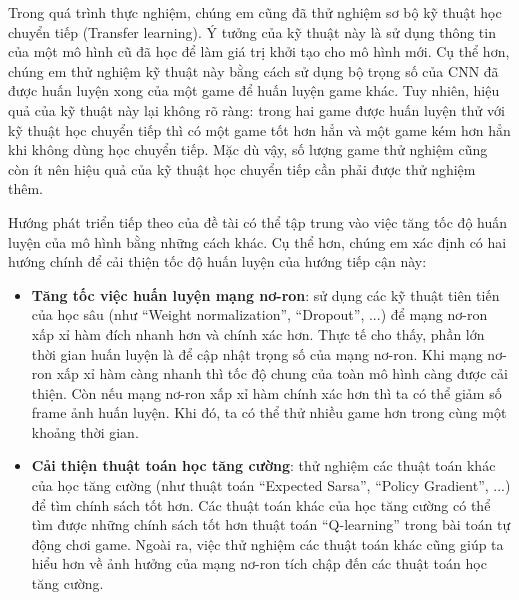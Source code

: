 	Trong quá trình thực nghiệm, chúng em cũng đã thử nghiệm sơ bộ kỹ thuật học chuyển tiếp (Transfer learning).
	Ý tưởng của kỹ thuật này là sử dụng thông tin của một mô hình cũ đã học để làm giá trị khởi tạo cho mô hình mới.
	Cụ thể hơn, chúng em thử nghiệm kỹ thuật này bằng cách sử dụng bộ trọng số của CNN đã được huấn luyện xong của một game để huấn luyện game khác.
	Tuy nhiên, hiệu quả của kỹ thuật này lại không rõ ràng: trong hai game được huấn luyện thử với kỹ thuật học chuyển tiếp thì có một game tốt hơn hẳn và một game kém hơn hẳn khi không dùng học chuyển tiếp.
	Mặc dù vậy, số lượng game thử nghiệm cũng còn ít nên hiệu quả của kỹ thuật học chuyển tiếp cần phải được thử nghiệm thêm.

	Hướng phát triển tiếp theo của đề tài có thể tập trung vào việc tăng tốc độ huấn luyện của mô hình bằng những cách khác.
	Cụ thể hơn, chúng em xác định có hai hướng chính để cải thiện tốc độ huấn luyện của hướng tiếp cận này:
	\begin{itemize}
		\item \textbf{Tăng tốc việc huấn luyện mạng nơ-ron}: sử dụng các kỹ thuật tiên tiến của học sâu (như ``Weight normalization'', ``Dropout'', ...) để mạng nơ-ron xấp xỉ hàm đích nhanh hơn và chính xác hơn.
		Thực tế cho thấy, phần lớn thời gian huấn luyện là để cập nhật trọng số của mạng nơ-ron. 
		Khi mạng nơ-ron xấp xỉ hàm càng nhanh thì tốc độ chung của toàn mô hình càng được cải thiện.
		Còn nếu mạng nơ-ron xấp xỉ hàm chính xác hơn thì ta có thể giảm số frame ảnh huấn luyện.
		Khi đó, ta có thể thử nhiều game hơn trong cùng một khoảng thời gian.
		\item \textbf{Cải thiện thuật toán học tăng cường}: thử nghiệm các thuật toán khác của học tăng cường (như thuật toán ``Expected Sarsa'', ``Policy Gradient'', ...) để tìm chính sách tốt hơn.
		Các thuật toán khác của học tăng cường có thể tìm được những chính sách tốt hơn thuật toán ``Q-learning'' trong bài toán tự động chơi game.
		Ngoài ra, việc thử nghiệm các thuật toán khác cũng giúp ta hiểu hơn về ảnh hưởng của mạng nơ-ron tích chập đến các thuật toán học tăng cường.
	\end{itemize}
	
